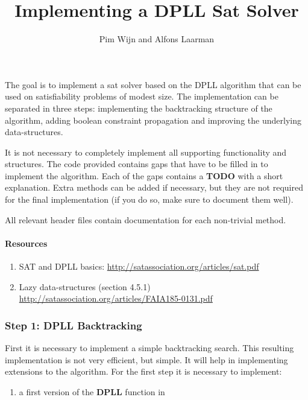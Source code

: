 \documentclass[12pt]{article}
\begin{document}
	\title{Implementing a DPLL Sat Solver}
	\author{Pim Wijn and Alfons Laarman}
	
	\maketitle
	
	The goal is to implement a sat solver based on the DPLL algorithm that can be used on satisfiability problems of modest size.
	The implementation can be separated in three steps: implementing the backtracking structure of the algorithm, adding boolean constraint propagation and improving the underlying data-structures.
	
	It is not necessary to completely implement all supporting functionality and structures. The code provided contains gaps that have to be filled in to implement the algorithm. Each of the gaps contains a \textbf{TODO} with a short explanation. Extra methods can be added if necessary, but they are not required for the final implementation (if you do so, make sure to document them well).
	
	All relevant header files contain documentation for each non-trivial method.
	
	\paragraph{Resources}
	\begin{enumerate}
		\item SAT and DPLL basics:  \url{http://satassociation.org/articles/sat.pdf}
		\item Lazy data-structures (section 4.5.1) \url{http://satassociation.org/articles/FAIA185-0131.pdf}
	\end{enumerate}
	
	
	\subsubsection*{Step 1: DPLL Backtracking}
	First it is necessary to implement a simple backtracking search. This resulting implementation is not very efficient, but simple. It will help in implementing extensions to the algorithm.
	For the first step it is necessary to implement:
	\begin{enumerate}
		\item a first version of the \textbf{DPLL} function in 
	\end{enumerate}
\end{document}
